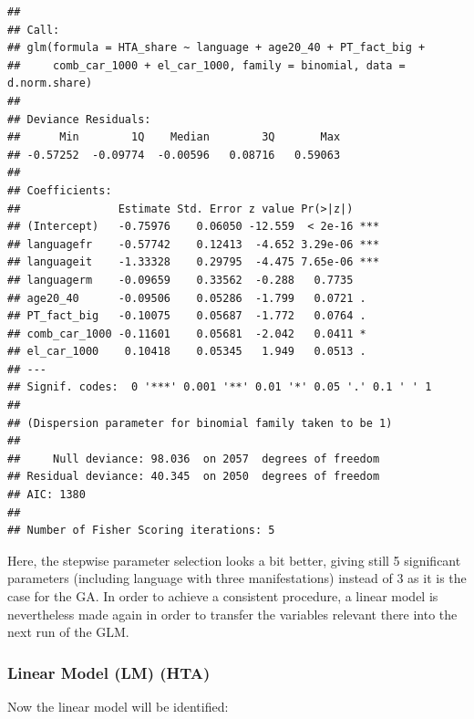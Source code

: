 \documentclass[
]{article}
\begin{document}
\begin{verbatim}
## 
## Call:
## glm(formula = HTA_share ~ language + age20_40 + PT_fact_big + 
##     comb_car_1000 + el_car_1000, family = binomial, data = d.norm.share)
## 
## Deviance Residuals: 
##      Min        1Q    Median        3Q       Max  
## -0.57252  -0.09774  -0.00596   0.08716   0.59063  
## 
## Coefficients:
##               Estimate Std. Error z value Pr(>|z|)    
## (Intercept)   -0.75976    0.06050 -12.559  < 2e-16 ***
## languagefr    -0.57742    0.12413  -4.652 3.29e-06 ***
## languageit    -1.33328    0.29795  -4.475 7.65e-06 ***
## languagerm    -0.09659    0.33562  -0.288   0.7735    
## age20_40      -0.09506    0.05286  -1.799   0.0721 .  
## PT_fact_big   -0.10075    0.05687  -1.772   0.0764 .  
## comb_car_1000 -0.11601    0.05681  -2.042   0.0411 *  
## el_car_1000    0.10418    0.05345   1.949   0.0513 .  
## ---
## Signif. codes:  0 '***' 0.001 '**' 0.01 '*' 0.05 '.' 0.1 ' ' 1
## 
## (Dispersion parameter for binomial family taken to be 1)
## 
##     Null deviance: 98.036  on 2057  degrees of freedom
## Residual deviance: 40.345  on 2050  degrees of freedom
## AIC: 1380
## 
## Number of Fisher Scoring iterations: 5
\end{verbatim}

Here, the stepwise parameter selection looks a bit better, giving still
5 significant parameters (including language with three manifestations)
instead of 3 as it is the case for the GA. In order to achieve a
consistent procedure, a linear model is nevertheless made again in order
to transfer the variables relevant there into the next run of the GLM.

\hypertarget{linear-model-lm-hta}{%
\subsubsection{Linear Model (LM) (HTA)}\label{linear-model-lm-hta}}

Now the linear model will be identified:
\end{document}
